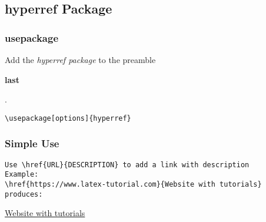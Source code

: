 \documentclass[class=book , crop=false]{standalone}
\title{}  %
\begin{document}


\subsection{hyperref Package}
\medskip 
\subsubsection{\Large usepackage}

Add the \textit{hyperref package} to the preamble\begin{large}\textbf{ last}\end{large}.	

\begin{verbatim}\usepackage[options]{hyperref}\end{verbatim}

\subsubsection{\Large Simple Use}
\begin{verbatim}Use \href{URL}{DESCRIPTION} to add a link with description
Example:
\href{https://www.latex-tutorial.com}{Website with tutorials}
produces:
\end{verbatim}
\href{https://www.latex-tutorial.com}{Website with tutorials}

	
\end{document}
